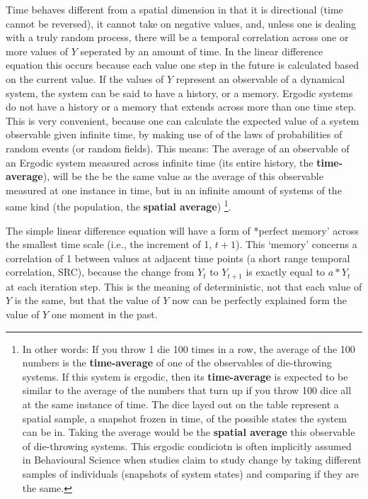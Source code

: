 \documentclass[]{book}
\let\rmarkdownfootnote\footnote%
\def\footnote{\protect\rmarkdownfootnote}
\begin{document}
Time behaves different from a spatial dimension in that it is
directional (time cannot be reversed), it cannot take on negative
values, and, unless one is dealing with a truly random process, there
will be a temporal correlation across one or more values of \(Y\)
seperated by an amount of time. In the linear difference equation this
occurs because each value one step in the future is calculated based on
the current value. If the values of \(Y\) represent an observable of a
dynamical system, the system can be said to have a history, or a memory.
Ergodic systems do not have a history or a memory that extends across
more than one time step. This is very convenient, because one can
calculate the expected value of a system observable given infinite time,
by making use of of the laws of probabilities of random events (or
random fields). This means: The average of an observable of an Ergodic
system measured across infinite time (its entire history, the
\textbf{time-average}), will be the be the same value as the average of
this observable measured at one instance in time, but in an infinite
amount of systems of the same kind (the population, the \textbf{spatial
average}) \footnote{In other words: If you throw 1 die 100 times in a
  row, the average of the 100 numbers is the \textbf{time-average} of
  one of the observables of die-throwing systems. If this system is
  ergodic, then its \textbf{time-average} is expected to be similar to
  the average of the numbers that turn up if you throw 100 dice all at
  the same instance of time. The dice layed out on the table represent a
  spatial sample, a snapshot frozen in time, of the possible states the
  system can be in. Taking the average would be the \textbf{spatial
  average} this observable of die-throwing systems. This ergodic
  condiciotn is often implicitly assumed in Behavioural Science when
  studies claim to study change by taking different samples of
  individuals (snapshots of system states) and comparing if they are the
  same.}.

The simple linear difference equation will have a form of *perfect
memory' across the smallest time scale (i.e., the increment of 1,
\(t+1\)). This `memory' concerns a correlation of 1 between values at
adjacent time points (a short range temporal correlation, SRC), because
the change from \(Y_t\) to \(Y_{t+1}\) is exactly equal to \(a * Y_t\)
at each iteration step. This is the meaning of deterministic, not that
each value of \(Y\) is the same, but that the value of \(Y\) now can be
perfectly explained form the value of \(Y\) one moment in the past.
\end{document}
